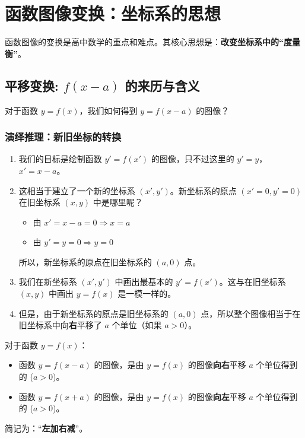 \documentclass[a4paper,12pt]{ctexart}
\theoremstyle{mytheoremstyle}
\begin{document}
\section{函数图像变换：坐标系的思想}

函数图像的变换是高中数学的重点和难点。其核心思想是：\textbf{改变坐标系中的“度量衡”}。

\subsection{平移变换: $f(x-a)$ 的来历与含义}

对于函数 $y = f(x)$，我们如何得到 $y = f(x-a)$ 的图像？

\subsubsection{演绎推理：新旧坐标的转换}
\begin{enumerate}
    \item 我们的目标是绘制函数 $y' = f(x')$ 的图像，只不过这里的 $y' = y$，$x' = x-a$。
    \item 这相当于建立了一个新的坐标系 $(x', y')$。新坐标系的原点 $(x'=0, y'=0)$ 在旧坐标系 $(x,y)$ 中是哪里呢？
          \begin{itemize}
              \item 由 $x' = x - a = 0 \Rightarrow x=a$
              \item 由 $y' = y = 0 \Rightarrow y=0$
          \end{itemize}
          所以，新坐标系的原点在旧坐标系的 $(a,0)$ 点。
    \item 我们在新坐标系 $(x', y')$ 中画出最基本的 $y' = f(x')$。这与在旧坐标系 $(x, y)$ 中画出 $y=f(x)$ 是一模一样的。
    \item 但是，由于新坐标系的原点是旧坐标系的 $(a,0)$ 点，所以整个图像相当于在旧坐标系中向\textbf{右}平移了 $a$ 个单位（如果 $a>0$）。
\end{enumerate}

\begin{tcolorbox}[colback=blue!5!white, colframe=blue!75!black, title={\large \bfseries 结论：左右平移法则}]
    对于函数 $y=f(x)$：
    \begin{itemize}
        \item 函数 $y = f(x-a)$ 的图像，是由 $y=f(x)$ 的图像\textbf{向右}平移 $a$ 个单位得到的 ($a>0$)。
        \item 函数 $y = f(x+a)$ 的图像，是由 $y=f(x)$ 的图像\textbf{向左}平移 $a$ 个单位得到的 ($a>0$)。
    \end{itemize}
    简记为：“\textbf{左加右减}”。
\end{tcolorbox}
\end{document}

